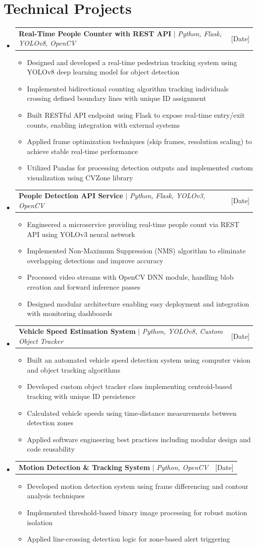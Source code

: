 \documentclass[letterpaper,11pt]{article}
\makeatletter
\newcommand{\resumeItem}[1]{
  \item\small{
    {#1 \vspace{-2pt}}
  }
}
\newcommand{\resumeProjectHeading}[2]{
    \item
    \begin{tabular*}{0.97\textwidth}{l@{\extracolsep{\fill}}r}
      \small#1 & #2 \\
    \end{tabular*}\vspace{-7pt}
}
\newcommand{\resumeSubHeadingListStart}{\begin{itemize}[leftmargin=0.15in, label={}]}
\newcommand{\resumeSubHeadingListEnd}{\end{itemize}}
\newcommand{\resumeItemListStart}{\begin{itemize}}
\newcommand{\resumeItemListEnd}{\end{itemize}\vspace{-5pt}}
\makeatother
\begin{document}
\section{Technical Projects}
    \resumeSubHeadingListStart
      \resumeProjectHeading
          {\textbf{Real-Time People Counter with REST API} $|$ \emph{Python, Flask, YOLOv8, OpenCV}}{[Date]}
          \resumeItemListStart
            \resumeItem{Designed and developed a real-time pedestrian tracking system using YOLOv8 deep learning model for object detection}
            \resumeItem{Implemented bidirectional counting algorithm tracking individuals crossing defined boundary lines with unique ID assignment}
            \resumeItem{Built RESTful API endpoint using Flask to expose real-time entry/exit counts, enabling integration with external systems}
            \resumeItem{Applied frame optimization techniques (skip frames, resolution scaling) to achieve stable real-time performance}
            \resumeItem{Utilized Pandas for processing detection outputs and implemented custom visualization using CVZone library}
          \resumeItemListEnd
      \resumeProjectHeading
          {\textbf{People Detection API Service} $|$ \emph{Python, Flask, YOLOv3, OpenCV}}{[Date]}
          \resumeItemListStart
            \resumeItem{Engineered a microservice providing real-time people count via REST API using YOLOv3 neural network}
            \resumeItem{Implemented Non-Maximum Suppression (NMS) algorithm to eliminate overlapping detections and improve accuracy}
            \resumeItem{Processed video streams with OpenCV DNN module, handling blob creation and forward inference passes}
            \resumeItem{Designed modular architecture enabling easy deployment and integration with monitoring dashboards}
          \resumeItemListEnd
      \resumeProjectHeading
          {\textbf{Vehicle Speed Estimation System} $|$ \emph{Python, YOLOv8, Custom Object Tracker}}{[Date]}
          \resumeItemListStart
            \resumeItem{Built an automated vehicle speed detection system using computer vision and object tracking algorithms}
            \resumeItem{Developed custom object tracker class implementing centroid-based tracking with unique ID persistence}
            \resumeItem{Calculated vehicle speeds using time-distance measurements between detection zones}
            \resumeItem{Applied software engineering best practices including modular design and code reusability}
          \resumeItemListEnd
      \resumeProjectHeading
          {\textbf{Motion Detection \& Tracking System} $|$ \emph{Python, OpenCV}}{[Date]}
          \resumeItemListStart
            \resumeItem{Developed motion detection system using frame differencing and contour analysis techniques}
            \resumeItem{Implemented threshold-based binary image processing for robust motion isolation}
            \resumeItem{Applied line-crossing detection logic for zone-based alert triggering}
          \resumeItemListEnd
    \resumeSubHeadingListEnd
\end{document}
